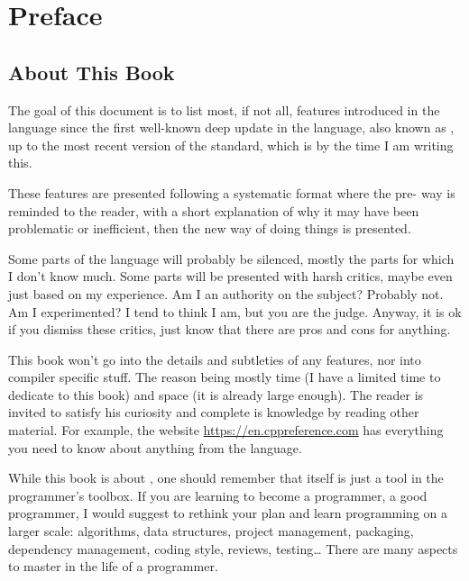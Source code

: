 \chapter{Preface}

\section{About This Book}
The goal of this document is to list most, if not all, features
introduced in the \cpp language since the first well-known deep update
in the language, also known as , up to the most recent version
of the standard, which is  by the time I am writing this.

These features are presented following a systematic format where the
pre- way is reminded to the reader, with a short explanation of
why it may have been problematic or inefficient, then the new way of
doing things is presented.

Some parts of the language will probably be silenced, mostly the parts
for which I don't know much. Some parts will be presented with harsh
critics, maybe even just based on my experience. Am I an authority on
the subject? Probably not. Am I experimented? I tend to think I am,
but you are the judge. Anyway, it is ok if you dismiss these critics,
just know that there are pros and cons for anything.

This book won't go into the details and subtleties of any features,
nor into compiler specific stuff. The reason being mostly time (I have
a limited time to dedicate to this book) and space (it is already
large enough). The reader is invited to satisfy his curiosity and
complete is knowledge by reading other material. For example, the
website \url{https://en.cppreference.com} has everything you need to
know about anything from the language.

\bigskip

While this book is about \cpp, one should remember that \cpp{} itself
is just a tool in the programmer's toolbox. If you are learning \cpp{}
to become a programmer, a good programmer, I would suggest to rethink
your plan and learn programming on a larger scale: algorithms, data
structures, project management, packaging, dependency management,
coding style, reviews, testing… There are many aspects to master in
the life of a programmer.

